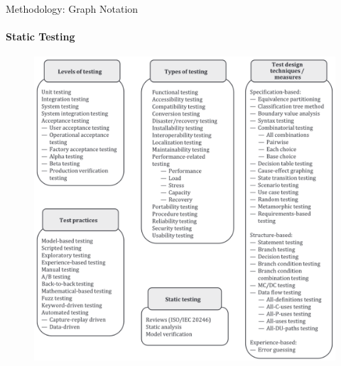 \documentclass{beamer}
\begin{document}
\begin{frame}[t]{Methodology: Graph Notation}
    \framesubtitle{Static Testing}
    \begin{figure}
        \centering
        \includegraphics[height=0.65\textheight]{assets/images/test approach choices}
        \caption{\tiny \citep[Fig.~2]{IEEE2022}}
    \end{figure}
\end{frame}
\end{document}
